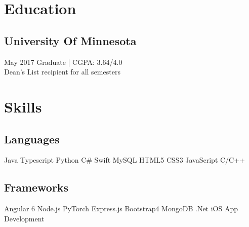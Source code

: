 \documentclass[]{rinkal_resume}
\begin{document}
%
%


%
%

\begin{minipage}[t]{0.30\textwidth} 


\section{Education} 

\subsection{University Of Minnesota}
\small May 2017  Graduate | CGPA: 3.64/4.0 \\
\small Dean's List recipient for all semesters
\sectionsep


\section{Skills}
\subsection{Languages}
\vspace{1pt}
Java \textbullet{} 
Typescript \textbullet{}
Python \textbullet{}
C\# \textbullet{} 
Swift %
MySQL \textbullet{}
HTML5 \textbullet{}
CSS3 \textbullet{}
JavaScript %
C/C++
\sectionsep

\vspace{1pt}
\subsection{Frameworks}
\vspace{1pt}
Angular 6 \textbullet{}
Node.js \textbullet{}
PyTorch \textbullet{}
Express.js %
Bootstrap4 \textbullet{}
MongoDB \textbullet{}
.Net \textbullet{}
iOS App Development 
\sectionsep


\end{minipage}
\end{document}
